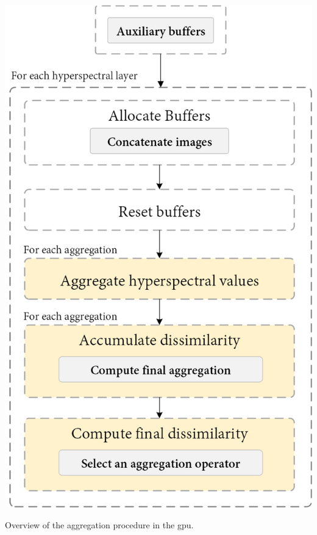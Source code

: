 \begin{marginfigure}[.2cm]
    \centering
    \includegraphics[width=\linewidth]{figs/hyper_point_cloud/aggregation_operator.png}
	\caption{Overview of the aggregation procedure in the \acrshort{gpu}. }
	\label{fig:hyper_aggregation_insight}
\end{marginfigure}
